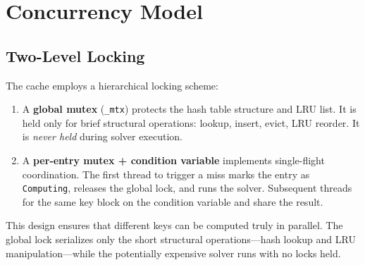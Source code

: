 \documentclass[11pt,a4paper]{article}
\begin{document}
\section{Concurrency Model}
\label{sec:concurrency}

\subsection{Two-Level Locking}

The cache employs a hierarchical locking scheme:

\begin{enumerate}
\item A \textbf{global mutex} (\texttt{\_mtx}) protects the hash table
      structure and LRU list.  It is held only for brief structural
      operations: lookup, insert, evict, LRU reorder.  It is
      \emph{never held} during solver execution.
\item A \textbf{per-entry mutex + condition variable} implements
      single-flight coordination.  The first thread to trigger a miss
      marks the entry as \texttt{Computing}, releases the global lock,
      and runs the solver.  Subsequent threads for the same key block on
      the condition variable and share the result.
\end{enumerate}

This design ensures that different keys can be computed truly in
parallel.  The global lock serializes only the short structural
operations---hash lookup and LRU manipulation---while the potentially
expensive solver runs with no locks held.
\end{document}
